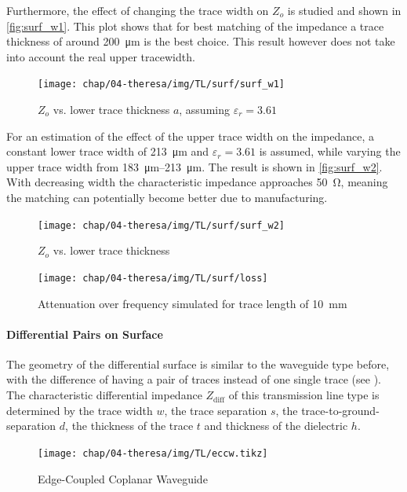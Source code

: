 Furthermore, the effect of changing the trace width on $Z_o$ is studied and shown in \autoref{fig:surf_w1}.
This plot shows that for best matching of the impedance a trace thickness of around \SI{200}{\micro \meter} is the best choice.
This result however does not take into account the real upper tracewidth.
\begin{figure}[tbh]
	\centering
	\texttt{[image: chap/04-theresa/img/TL/surf/surf\_w1]}
	\caption[CWG, $Z_o$ vs. $a$]{$Z_o$ vs. lower trace thickness $a$, assuming $\varepsilon_r = 3.61$}
	\label{fig:surf_w1}
\end{figure}

For an estimation of the effect of the upper trace width on the impedance, a constant lower trace width of \SI{213}{\micro \meter} and $\varepsilon_r = 3.61$ is assumed, while varying the upper trace width from \SIrange{183}{213}{\micro \meter}.
The result is shown in \autoref{fig:surf_w2}.
With decreasing width the characteristic impedance approaches \SI{50}{\ohm}, meaning the matching can potentially become better due to manufacturing.
\begin{figure}[tbh]
	\centering
	\texttt{[image: chap/04-theresa/img/TL/surf/surf\_w2]}
	\caption{$Z_o$ vs. lower trace thickness}
	\label{fig:surf_w2}
\end{figure}


\begin{figure}[tbh]
	\centering
	\texttt{[image: chap/04-theresa/img/TL/surf/loss]}
	\caption{Attenuation over frequency simulated for trace length of \SI{10}{\mm}}
	\label{fig:surf_loss}
\end{figure}


\paragraph{Differential Pairs on Surface}
The geometry of the differential surface is similar to the waveguide type before, with the difference of having a pair of traces instead of one single trace (see ).
The characteristic differential impedance $Z_\text{diff}$ of this transmission line type is determined by the trace width $w$, the trace separation $s$, the trace-to-ground-separation $d$, the thickness of the trace $t$ and thickness of the dielectric $h$.

\begin{figure}[tbh]
	\centering
	\texttt{[image: chap/04-theresa/img/TL/eccw.tikz]}
	\caption{Edge-Coupled Coplanar Waveguide}
	\label{fig:eccw_geometry}
\end{figure}

